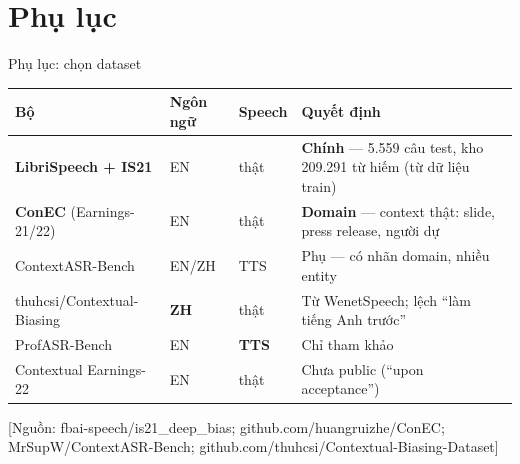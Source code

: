 \documentclass[aspectratio=169,xcolor=table]{beamer}
\newcommand{\hi}[1]{\textcolor{Primary}{\textbf{#1}}}
\newcommand{\bad}[1]{\textcolor{RiskRed}{\textbf{#1}}}
\newcommand{\src}[1]{{\tiny\color{TextGray}[Nguồn: #1]}}
\newcommand{\cmark}{\textcolor{GoodGreen}{\ding{51}}}
\newcommand{\xmark}{\textcolor{RiskRed}{\ding{55}}}
\newcommand{\pmark}{\textcolor{Accent!85!black}{\ding{108}}}
\begin{document}
\section{Phụ lục}
\begin{frame}{Phụ lục: chọn dataset}
\small\renewcommand{\arraystretch}{1.2}
\begin{tabular}{@{}p{3.4cm}p{1.6cm}p{1.6cm}p{5.6cm}@{}}
\toprule
\textbf{Bộ} & \textbf{Ngôn ngữ} & \textbf{Speech} & \textbf{Quyết định} \\
\midrule
\hi{LibriSpeech + IS21} & EN & thật & \cmark{} \textbf{Chính} --- 5.559 câu test, kho 209.291 từ hiếm (từ dữ liệu train) \\
\hi{ConEC} (Earnings-21/22) & EN & thật & \cmark{} \textbf{Domain} --- context thật: slide, press release, người dự \\
ContextASR-Bench & EN/ZH & TTS & \pmark{} Phụ --- có nhãn domain, nhiều entity \\
thuhcsi/Contextual-Biasing & \bad{ZH} & thật & \xmark{} Từ WenetSpeech; lệch ``làm tiếng Anh trước'' \\
ProfASR-Bench & EN & \bad{TTS} & \xmark{} Chỉ tham khảo \\
Contextual Earnings-22 & EN & thật & \xmark{} Chưa public (``upon acceptance'') \\
\bottomrule
\end{tabular}
\vfill\src{fbai-speech/is21\_deep\_bias; github.com/huangruizhe/ConEC; MrSupW/ContextASR-Bench; github.com/thuhcsi/Contextual-Biasing-Dataset}
\end{frame}
\end{document}
